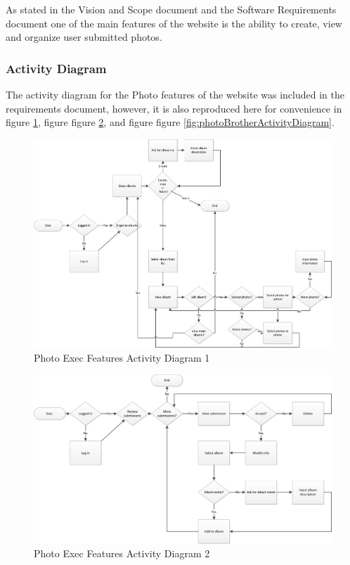 \documentclass{article}
\begin{document}
As stated in the Vision and Scope document and the Software Requirements document one of the main features of the website is the ability to create, view and organize user submitted photos.

\subsubsection{Activity Diagram}
The activity diagram for the Photo features of the website was included in the requirements document, however, it is also reproduced here for convenience in figure \ref{fig:photoExec1ActivityDiagram}, figure figure \ref{fig:photoExec2ActivityDiagram}, and figure figure \ref{fig:photoBrotherActivityDiagram}.

\FloatBarrier
\begin{figure}
\centering
\includegraphics[scale=.65]{img/activityDiagrams/photoActivity1_1}
\caption{Photo Exec Features Activity Diagram 1}
\label{fig:photoExec1ActivityDiagram}
\end{figure}
\FloatBarrier

\FloatBarrier
\begin{figure}
\centering
\includegraphics[scale=.65]{img/activityDiagrams/photoActivity1_2}
\caption{Photo Exec Features Activity Diagram 2}
\label{fig:photoExec2ActivityDiagram}
\end{figure}
\FloatBarrier
\end{document}
